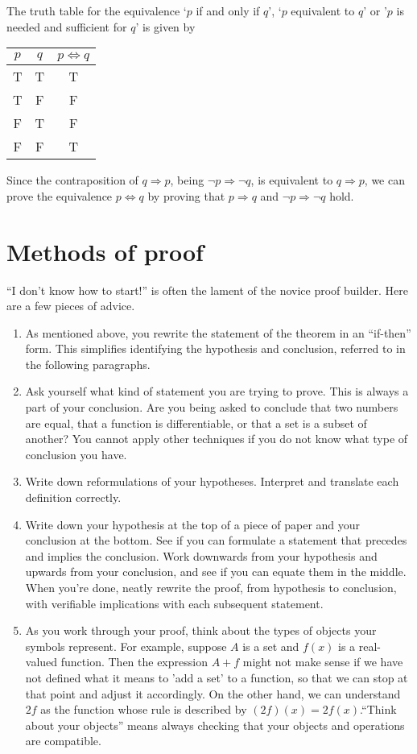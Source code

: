 The truth table for the equivalence `$p$ if and only if $q$', `$p$ equivalent to $q$' or '$p$ is needed and sufficient for $q$' is given by
\begin{center}
\begin{tabular}{cc|c}
     $p$&$q$& $p\Leftrightarrow q$  \\\hline
     T&T&T\\
     T&F&F\\
     F&T&F\\
     F&F&T
\end{tabular}
\end{center}

Since the contraposition of $q \Rightarrow p$, being $\neg p\Rightarrow\neg q$, is equivalent to $q\Rightarrow p$, we can prove the equivalence $p\Leftrightarrow q$ by proving that $p\Rightarrow q$ and $\neg p\Rightarrow\neg q$ hold. 


\section{Methods of proof}
``I don't know how to start!'' is often the lament of the novice proof builder. Here are a few pieces of advice.
%
\begin{enumerate}
%
\item  As mentioned above, you rewrite the statement of the theorem in an ``if-then'' form. This simplifies identifying the hypothesis and conclusion, referred to in the following paragraphs.
%
\item Ask yourself what kind of statement you are trying to prove. This is always a part of your conclusion. Are you being asked to conclude that two numbers are equal, that a function is differentiable, or that a set is a subset of another? You cannot apply other techniques if you do not know what type of conclusion you have.
%
\item  Write down reformulations of your hypotheses. Interpret and translate each definition correctly.
%
\item Write down your hypothesis at the top of a piece of paper and your conclusion at the bottom. See if you can formulate a statement that precedes and implies the conclusion. Work downwards from your hypothesis and upwards from your conclusion, and see if you can equate them in the middle. When you're done, neatly rewrite the proof, from hypothesis to conclusion, with verifiable implications with each subsequent statement.
%
\item As you work through your proof, think about the types of objects your symbols represent. For example, suppose $A$ is a set and $f(x)$ is a real-valued function. Then the expression $A+f$ might not make sense if we have not defined what it means to 'add a set' to a function, so that we can stop at that point and adjust it accordingly. On the other hand, we can understand $2f$ as the function whose rule is described by $(2f)(x)=2f(x )$.``Think about your objects'' means always checking that your objects and operations are compatible.
%
\end{enumerate}

